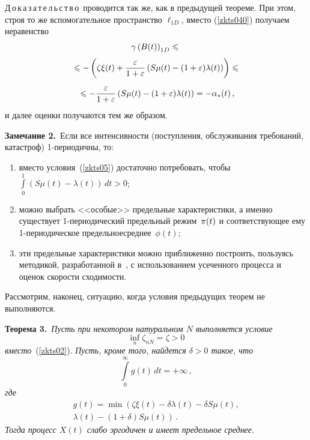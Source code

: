 \begin{multicols}{2}
\medskip

\noindent
Д\,о\,к\,а\,з\,а\,т\,е\,л\,ь\,с\,т\,в\,о\ проводится так же, как в предыду\-щей теореме. При этом, строя то же вспомогательное пространство $\ell_{1D}$, вместо (\ref{zkts040}) получаем
неравенство
\begin{multline*}
\gamma \left(B(t)\right)_{1D} \leqslant{}\\[3pt]
{}\leqslant  -\left(\zeta\xi(t) + \displaystyle\frac{\displaystyle \varepsilon\mathstrut}{\displaystyle 1+\varepsilon\mathstrut}\left(S\mu(t)-
(1+\varepsilon)\lambda(t)\right)\right)  \leqslant{}\\[3pt]
{}\leqslant -\displaystyle\frac{\displaystyle \varepsilon\mathstrut}{\displaystyle 1+\varepsilon\mathstrut}\left(S\mu(t)-(1+\varepsilon)\lambda(t)\right) = -\alpha_*(t)\,,
\end{multline*}
и далее оценки получаются тем же образом.


\bigskip
\noindent
\textbf{Замечание 2.}\ Если все интенсивности (поступления, обслуживания требований, катастроф) 1-пе\-ри\-о\-дич\-ны, то:
\begin{enumerate}[(1)]
\item вместо условия~(\ref{zkts05}) достаточно потребовать, чтобы $\int\limits_0^1 \left(S\mu(t) - \lambda(t)\right) \,dt>0$;
\item
можно выбрать <<особые>> предельные харак\-теристики, а именно  существует 1-пе\-ри\-о\-ди\-че\-ский предельный режим~${\bf \pi}(t)$
и соответствующее ему 1-периодическое предельное\linebreak среднее~$\phi(t)$;
\item
эти предельные характеристики можно приближенно построить, пользуясь методикой,
разработанной в~\cite{z09, z06},
с использованием усеченного процесса и оценок скорости схо\-ди\-мости.
\end{enumerate}

\medskip

Рассмотрим, наконец, ситуацию, когда условия предыдущих теорем не выполняются.

\bigskip

\noindent
\textbf{Теорема 3.}\ \textit{Пусть при некотором  натуральном $N$ выполняется условие}
\begin{equation*}
\inf_n \zeta_{nN} = \zeta > 0
\end{equation*}
\textit{вместо}~(\ref{zkts02}). \textit{Пусть, кроме того,  найдется $\delta > 0$ такое, что}
\begin{equation*}
\int\limits_0^{\infty} g(t)\, dt = +\infty\,,
\end{equation*}
\textit{где}
\begin{multline*}
g(t) = \min \left(\zeta \xi(t)-\delta\lambda(t) - \delta S\mu(t),\right.\\
\left.
\lambda(t) - \left(1+\delta\right) S\mu(t)\right)\,.
\end{multline*}
\textit{Тогда процесс $X(t)$ слабо эргодичен и имеет предельное среднее.}


\end{multicols}
